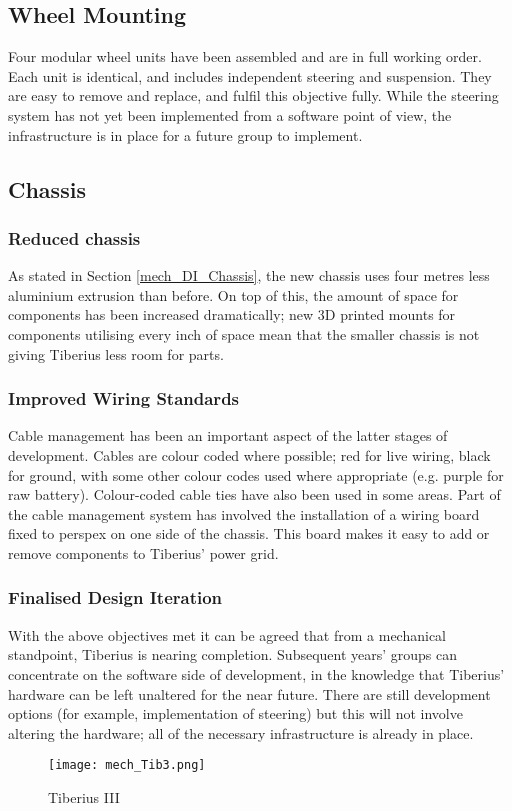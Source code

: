 \subsection{Wheel Mounting}
Four modular wheel units have been assembled and are in full working order. Each unit is identical, and includes independent steering and suspension. They are easy to remove and replace, and fulfil this objective fully. While the steering system has not yet been implemented from a software point of view, the infrastructure is in place for a future group to implement.

\subsection{Chassis}
\subsubsection{Reduced chassis}
As stated in Section \ref{mech_DI_Chassis}, the new chassis uses four metres less aluminium extrusion than before. On top of this, the amount of space for components has been increased dramatically; new 3D printed mounts for components utilising every inch of space mean that the smaller chassis is not giving Tiberius less room for parts.

\subsubsection{Improved Wiring Standards}
Cable management has been an important aspect of the latter stages of development. Cables are colour coded where possible; red for live wiring, black for ground, with some other colour codes used where appropriate (e.g. purple for raw battery). Colour-coded cable ties have also been used in some areas.
\newline
Part of the cable management system has involved the installation of a wiring board fixed to perspex on one side of the chassis. This board makes it easy to add or remove components to Tiberius' power grid.

\subsubsection{Finalised Design Iteration}
With the above objectives met it can be agreed that from a mechanical standpoint, Tiberius is nearing completion. Subsequent years' groups can concentrate on the software side of development, in the knowledge that Tiberius' hardware can be left unaltered for the near future. There are still development options (for example, implementation of steering) but this will not involve altering the hardware; all of the necessary infrastructure is already in place.
\begin{figure}[!htb]
\begin{center}
\texttt{[image: mech\_Tib3.png]}
\end{center}
\caption{Tiberius III}
\label{fig:mech_tib3}
\end{figure}